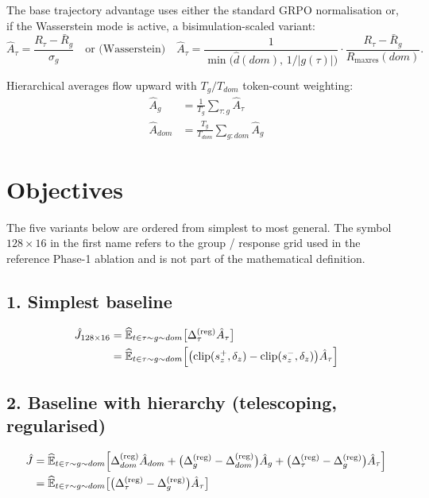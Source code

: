 \documentclass{article}
\DeclareMathOperator*{\clip}{clip}
\newcommand{\Ehat}{\widehat{\mathbb{E}}}
\begin{document}
The base trajectory advantage uses either the standard GRPO normalisation or,
if the Wasserstein mode is active, a bisimulation-scaled variant:
\[
\hat A_\tau
  = \frac{R_\tau - \bar R_g}{\sigma_g}
  \quad\text{or (Wasserstein)}\quad
  \hat A_\tau
  = \frac{1}{\min\!\bigl(\hat d(dom),\,1/|g(\tau)|\bigr)}\cdot\frac{R_\tau - \bar R_g}{R_{\max\text{res}}(dom)}.
\]

Hierarchical averages flow upward with $T_g / T_{dom}$ token-count weighting:
\begin{align*}
\hat A_g   &= \frac{1}{T_g}\sum_{\tau:g}\hat A_\tau \\
\hat A_{dom} &= \frac{T_g}{T_{dom}}\sum_{g:dom}\hat A_g
\end{align*}

\section{Objectives}
\label{sec:obj}

The five variants below are ordered from simplest to most general. The
symbol $128\times 16$ in the first name refers to the group / response grid
used in the reference Phase-1 ablation and is not part of the mathematical
definition.

\subsection*{1. Simplest baseline}
\begin{align*}
\hat J_{128\times 16}
  &= \Ehat_{t \in \tau \sim g \sim dom}\bigl[\Delta_\tau^{(\text{reg})}\hat A_\tau\bigr] \\
  &= \Ehat_{t \in \tau \sim g \sim dom}\Bigl[\bigl(\clip(s_z^{+},\delta_z) - \clip(s_z^{-},\delta_z)\bigr)\hat A_\tau\Bigr]
\end{align*}

\subsection*{2. Baseline with hierarchy (telescoping, regularised)}
\begin{align*}
\hat J
  &= \Ehat_{t \in \tau \sim g \sim dom}\Bigl[
        \Delta_{dom}^{(\text{reg})}\hat A_{dom}
      + \bigl(\Delta_g^{(\text{reg})}   - \Delta_{dom}^{(\text{reg})}\bigr)\hat A_g
      + \bigl(\Delta_\tau^{(\text{reg})} - \Delta_g^{(\text{reg})}\bigr)\hat A_\tau
     \Bigr] \\
  &= \Ehat_{t \in \tau \sim g \sim dom}\bigl[\bigl(\Delta_\tau^{(\text{reg})} - \Delta_g^{(\text{reg})}\bigr)\hat A_\tau\bigr]
\end{align*}
\end{document}
